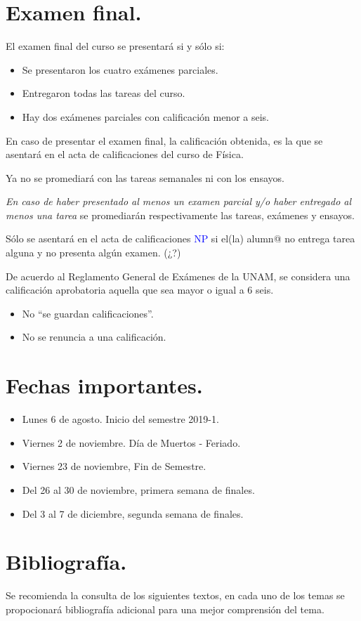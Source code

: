 \documentclass[12pt]{article}
\begin{document}
\section{Examen final.}
El examen final del curso se presentará si y sólo si:
\begin{itemize}
\item Se presentaron los cuatro exámenes parciales.
\item Entregaron todas las tareas del curso.
\item Hay dos exámenes parciales con calificación menor a seis.
\end{itemize}
En caso de presentar el examen final, la calificación obtenida, es la que se asentará en el acta de calificaciones del curso de Física.
\par
Ya no se promediará con las tareas semanales ni con los ensayos.
\par
\emph{En caso de haber presentado al menos un examen parcial y/o haber entregado al menos una tarea} se promediarán respectivamente las tareas, exámenes y ensayos.
\\
\par
Sólo se asentará en el acta de calificaciones \textcolor{blue}{NP} si el(la) alumn{@} no entrega tarea alguna y no presenta algún examen. (¿?)
\\
\par
De acuerdo al Reglamento General de Exámenes de la UNAM, se considera una calificación aprobatoria aquella que sea mayor o igual a $6$ seis.
\begin{itemize}
\item No \enquote{se guardan calificaciones}.
\item No se renuncia a una calificación.
\end{itemize}
\section{Fechas importantes.}
\begin{itemize}
\item Lunes 6 de agosto. Inicio del semestre 2019-1.
\item Viernes 2 de noviembre. Día de Muertos - Feriado.
\item Viernes 23 de noviembre, Fin de Semestre.
\item Del 26 al 30 de noviembre, primera semana de finales.
\item Del 3 al 7 de diciembre,  segunda semana de finales.
\end{itemize}
\newpage
\section{Bibliografía.}
Se recomienda la consulta de los siguientes textos, en cada uno de los temas se propocionará bibliografía adicional para una mejor comprensión del tema.
\nocite{*}


\end{document}
